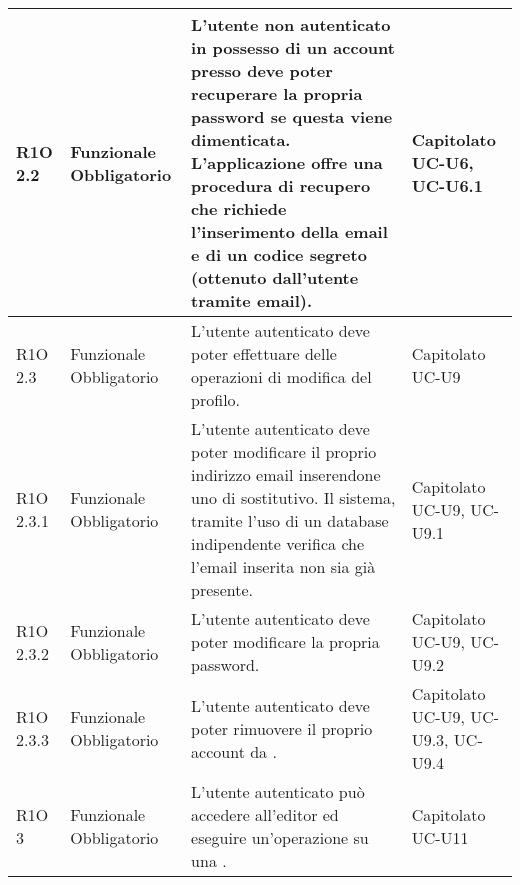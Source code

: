 \begin{center}
\begin{longtable}{ | l | p{2cm} | p{4.7cm} | p{2cm} |}
	R1O 2.2 & Funzionale \newline Obbligatorio & L’utente non autenticato in possesso di un account presso \glossaryItem{MaaS} deve poter recuperare la propria password se questa viene dimenticata.
L'applicazione offre una procedura di recupero che richiede l’inserimento della email e di un codice segreto (ottenuto dall’utente tramite email). &  Capitolato \newline UC-U6, UC-U6.1   \newline  \\ \hline
	
	R1O 2.3 & Funzionale \newline Obbligatorio & L’utente autenticato deve poter effettuare delle operazioni di modifica del profilo. &  Capitolato \newline  UC-U9  \newline  \\ \hline
	
	R1O 2.3.1 & Funzionale \newline Obbligatorio & L’utente autenticato deve poter modificare il proprio indirizzo email inserendone uno di sostitutivo. Il sistema, tramite l’uso di un database indipendente verifica che l’email inserita non sia già presente. &  Capitolato \newline  UC-U9, UC-U9.1  \newline  \\ \hline
	
	R1O 2.3.2 & Funzionale \newline Obbligatorio & L’utente autenticato deve poter modificare la propria password. &  Capitolato \newline  UC-U9, UC-U9.2  \newline  \\ \hline
	
	R1O 2.3.3 & Funzionale \newline Obbligatorio & L’utente autenticato deve poter rimuovere il proprio account da \glossaryItem{MaaS}. &  Capitolato \newline  UC-U9, UC-U9.3, UC-U9.4  \newline  \\ \hline
	
	R1O 3 & Funzionale \newline Obbligatorio & L’utente autenticato può accedere all’editor ed eseguire un’operazione su una \glossaryItem{DSL}. &  Capitolato \newline  UC-U11  \newline  \\ \hline
	

\end{longtable}
\end{center}
